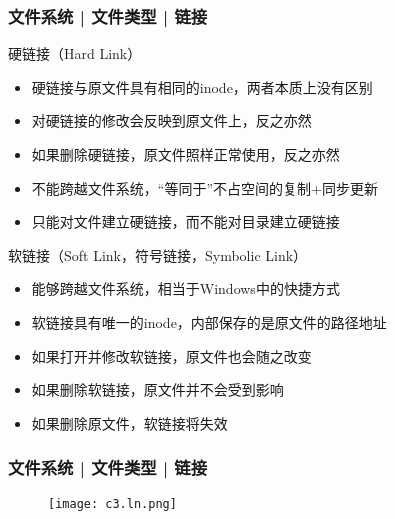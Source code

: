 \begin{frame}
  \frametitle{文件系统 | 文件类型 | \alert{链接}}
  \begin{block}{硬链接（Hard Link）}
    \begin{itemize}[<+->]
      \item 硬链接与原文件具有相同的inode，两者本质上没有区别
      \item 对硬链接的修改会反映到原文件上，反之亦然
      \item 如果删除硬链接，原文件照样正常使用，反之亦然
      \item 不能跨越文件系统，“等同于”不占空间的复制+同步更新
      \item 只能对文件建立硬链接，而不能对目录建立硬链接
    \end{itemize}
  \end{block}
  \pause
  \begin{block}{软链接（Soft Link，符号链接，Symbolic Link）}
    \begin{itemize}[<+->]
      \item 能够跨越文件系统，相当于Windows中的快捷方式
      \item 软链接具有唯一的inode，内部保存的是原文件的路径地址
      \item 如果打开并修改软链接，原文件也会随之改变
      \item 如果删除软链接，原文件并不会受到影响
      \item 如果删除原文件，软链接将失效
    \end{itemize}
  \end{block}
\end{frame}

\begin{frame}
  \frametitle{文件系统 | 文件类型 | 链接}
  \begin{figure}
    \centering
    \texttt{[image: c3.ln.png]}
  \end{figure}
\end{frame}

